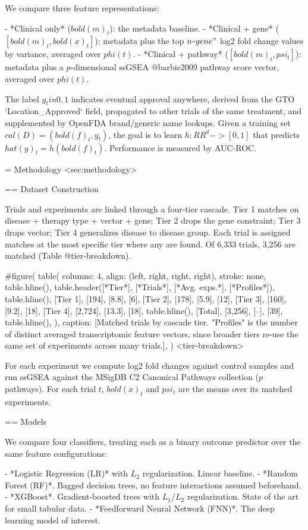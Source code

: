 We compare three feature representations:

- *Clinical only* ($bold(m)_t$): the metadata baseline.
- *Clinical + gene* ($[bold(m)_t, bold(x)_t]$): metadata plus the top $n_"gene"$ log2 fold change values by variance, averaged over $phi(t)$.
- *Clinical + pathway* ($[bold(m)_t, psi_t]$): metadata plus a $p$-dimensional ssGSEA @barbie2009 pathway score vector, averaged over $phi(t)$.

The label $y_t in {0, 1}$ indicates eventual approval anywhere, derived from the GTO `Location_Approved` field, propagated to other trials of the same treatment, and supplemented by OpenFDA brand/generic name lookups. Given a training set $cal(D) = {(bold(f)_t, y_t)}$, the goal is to learn $h: RR^d -> [0, 1]$ that predicts $hat(y)_t = h(bold(f)_t)$. Performance is measured by AUC-ROC.


= Methodology <sec:methodology>

== Dataset Construction

Trials and experiments are linked through a four-tier cascade. Tier 1 matches on disease + therapy type + vector + gene; Tier 2 drops the gene constraint; Tier 3 drops vector; Tier 4 generalizes disease to disease group. Each trial is assigned matches at the most specific tier where any are found. Of 6,333 trials, 3,256 are matched (Table @tier-breakdown).

#figure(
  table(
    columns: 4,
    align: (left, right, right, right),
    stroke: none,
    table.hline(),
    table.header([*Tier*], [*Trials*], [*Avg. exps.*], [*Profiles*]),
    table.hline(),
    [Tier 1], [194], [8.8], [6],
    [Tier 2], [178], [5.9], [12],
    [Tier 3], [160], [9.2], [18],
    [Tier 4], [2,724], [13.3], [18],
    table.hline(),
    [Total], [3,256], [--], [39],
    table.hline(),
  ),
  caption: [Matched trials by cascade tier. "Profiles" is the number of distinct averaged transcriptomic feature vectors, since broader tiers re-use the same set of experiments across many trials.],
) <tier-breakdown>

For each experiment we compute log2 fold changes against control samples and run ssGSEA against the MSigDB C2 Canonical Pathways collection ($p$ pathways). For each trial $t$, $bold(x)_t$ and $psi_t$ are the means over its matched experiments.

== Models

We compare four classifiers, treating each as a binary outcome predictor over the same feature configurations:

- *Logistic Regression (LR)* with $L_2$ regularization. Linear baseline.
- *Random Forest (RF)*. Bagged decision trees, no feature interactions assumed beforehand.
- *XGBoost*. Gradient-boosted trees with $L_1$/$L_2$ regularization. State of the art for small tabular data.
- *Feedforward Neural Network (FNN)*. The deep learning model of interest.

